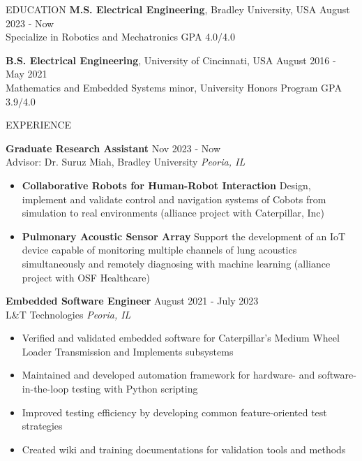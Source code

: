 \documentclass{lib/resume} %
\begin{document}
\begin{rSection}{EDUCATION}
    {\bf M.S. Electrical Engineering}, Bradley University, USA \hfill {August 2023 - Now} \\
    Specialize in Robotics and Mechatronics \hfill GPA 4.0/4.0 \smallskip

    {\bf B.S. Electrical Engineering}, University of Cincinnati, USA \hfill {August 2016 - May 2021}\\
    Mathematics and Embedded Systems minor, University Honors Program \hfill {GPA 3.9/4.0}
\end{rSection}

\begin{rSection}{EXPERIENCE}

    \textbf{Graduate Research Assistant} \hfill Nov 2023 - Now \\
    Advisor: Dr. Suruz Miah, Bradley University \hfill \textit{Peoria, IL}
    \begin{itemize}
        \itemsep -4pt {}
        \item \textbf{Collaborative Robots for Human-Robot Interaction} Design, implement and validate control and navigation systems of Cobots from simulation to real environments (alliance project with Caterpillar, Inc)
        \item \textbf{Pulmonary Acoustic Sensor Array} Support the development of an IoT device capable of monitoring multiple channels of lung acoustics simultaneously and remotely diagnosing with machine learning (alliance project with OSF Healthcare)
    \end{itemize}

    \textbf{Embedded Software Engineer} \hfill August 2021 - July 2023 \\
    L\&T Technologies \hfill \textit{Peoria, IL}
    \begin{itemize}
        \itemsep -4pt {}
        \item Verified and validated embedded software for Caterpillar's Medium Wheel Loader Transmission and Implements subsystems
        \item Maintained and developed automation framework for hardware- and software-in-the-loop testing with Python scripting
        \item Improved testing efficiency by developing common feature-oriented test strategies
        \item Created wiki and training documentations for validation tools and methods
    \end{itemize}


\end{rSection}
\end{document}
